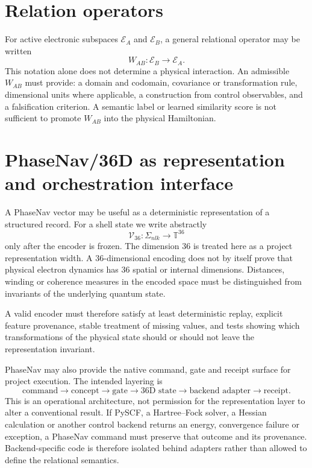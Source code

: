 \section{Relation operators}
For active electronic subspaces $\mathcal E_A$ and $\mathcal E_B$, a general relational operator may be written
\begin{equation}
W_{AB}:\mathcal E_B\rightarrow\mathcal E_A.
\end{equation}
This notation alone does not determine a physical interaction.  An admissible $W_{AB}$ must provide: a domain and codomain, covariance or transformation rule, dimensional units where applicable, a construction from control observables, and a falsification criterion.  A semantic label or learned similarity score is not sufficient to promote $W_{AB}$ into the physical Hamiltonian.

\section{PhaseNav/36D as representation and orchestration interface}
A PhaseNav vector may be useful as a deterministic representation of a structured record.  For a shell state we write abstractly
\begin{equation}
\mathcal V_{36}:\Sigma_{nlk}\longrightarrow\mathbb T^{36}
\end{equation}
only after the encoder is frozen.  The dimension 36 is treated here as a project representation width.  A 36-dimensional encoding does not by itself prove that physical electron dynamics has 36 spatial or internal dimensions.  Distances, winding or coherence measures in the encoded space must be distinguished from invariants of the underlying quantum state.

A valid encoder must therefore satisfy at least deterministic replay, explicit feature provenance, stable treatment of missing values, and tests showing which transformations of the physical state should or should not leave the representation invariant.

PhaseNav may also provide the native command, gate and receipt surface for project execution.  The intended layering is
\begin{equation}
\text{command}\rightarrow\text{concept}\rightarrow\text{gate}\rightarrow
\text{36D state}\rightarrow\text{backend adapter}\rightarrow\text{receipt}.
\end{equation}
This is an operational architecture, not permission for the representation layer to alter a conventional result.  If PySCF, a Hartree--Fock solver, a Hessian calculation or another control backend returns an energy, convergence failure or exception, a PhaseNav command must preserve that outcome and its provenance.  Backend-specific code is therefore isolated behind adapters rather than allowed to define the relational semantics.

